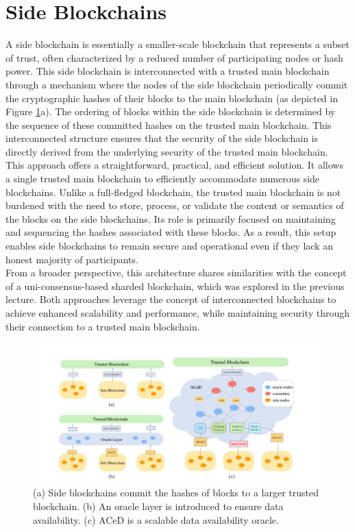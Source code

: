 \documentclass{report}
\begin{document}
\section{Side Blockchains}
A side blockchain is essentially a smaller-scale blockchain that represents a subset of trust, often characterized by a reduced number of participating nodes or hash power. This side blockchain is interconnected with a trusted main blockchain through a mechanism where the nodes of the side blockchain periodically commit the cryptographic hashes of their blocks to the main blockchain (as depicted in Figure \ref{fig:f1}a). The ordering of blocks within the side blockchain is determined by the sequence of these committed hashes on the trusted main blockchain. This interconnected structure ensures that the security of the side blockchain is directly derived from the underlying security of the trusted main blockchain.\\
This approach offers a straightforward, practical, and efficient solution. It allows a single trusted main blockchain to efficiently accommodate numerous side blockchains. Unlike a full-fledged blockchain, the trusted main blockchain is not burdened with the need to store, process, or validate the content or semantics of the blocks on the side blockchains. Its role is primarily focused on maintaining and sequencing the hashes associated with these blocks. As a result, this setup enables side blockchains to remain secure and operational even if they lack an honest majority of participants. \\
From a broader perspective, this architecture shares similarities with the concept of a uni-consensus-based sharded blockchain, which was explored in the previous lecture. Both approaches leverage the concept of interconnected blockchains to achieve enhanced scalability and performance, while maintaining security through their connection to a trusted main blockchain.
\begin{center}
	\begin{figure}
		\centering
		\includegraphics[width=0.8\linewidth]{Fig/F1}
		\caption{(a) Side blockchains commit the hashes of blocks to a larger trusted blockchain. (b) An oracle layer is introduced to ensure data availability. (c) ACeD is a scalable data availability oracle.
		}
		\label{fig:f1}
	\end{figure}
\end{center}
\end{document}
